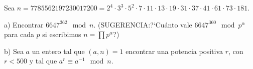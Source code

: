 










\begin{problem} [9]
Sea
$n=7785562197230017200=2^4\cdot3^3\cdot5^2\cdot7\cdot11\cdot13\cdot19\cdot31
\cdot37\cdot41\cdot61\cdot73\cdot181$.

a) Encontrar $6647^{362}\mod n$. (SUGERENCIA:?`Cuánto vale $6647^{360}\mod
p^{\alpha}$ para cada $p$ si escribimos $n=\prod p^{\alpha}$?)

b) Sea $a$ un entero tal que $(a,n)=1$ encontrar una potencia positiva $r$,
con $r<500$ y tal que $a^r\equiv a^{-1}\mod n$.

\solution
\end{problem}
